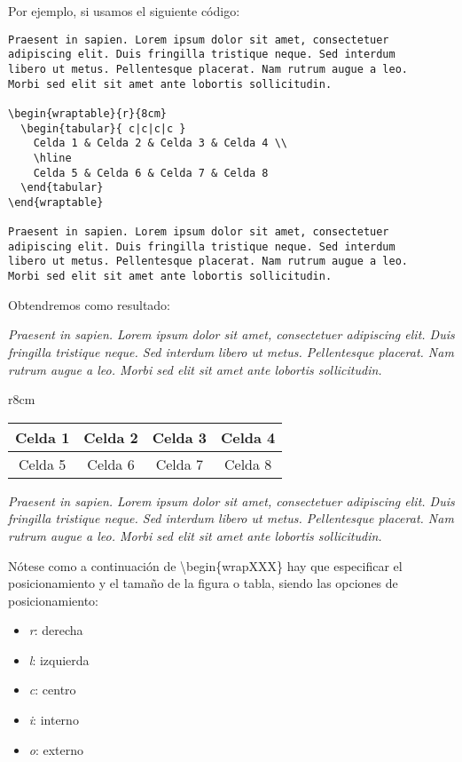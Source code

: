 Por ejemplo, si usamos el siguiente código:

\begin{lstlisting}[language={[LaTeX]TeX}]
Praesent in sapien. Lorem ipsum dolor sit amet, consectetuer 
adipiscing elit. Duis fringilla tristique neque. Sed interdum 
libero ut metus. Pellentesque placerat. Nam rutrum augue a leo. 
Morbi sed elit sit amet ante lobortis sollicitudin.

\begin{wraptable}{r}{8cm}
  \begin{tabular}{ c|c|c|c }
    Celda 1 & Celda 2 & Celda 3 & Celda 4 \\
    \hline
    Celda 5 & Celda 6 & Celda 7 & Celda 8
  \end{tabular}
\end{wraptable}

Praesent in sapien. Lorem ipsum dolor sit amet, consectetuer 
adipiscing elit. Duis fringilla tristique neque. Sed interdum 
libero ut metus. Pellentesque placerat. Nam rutrum augue a leo. 
Morbi sed elit sit amet ante lobortis sollicitudin.
\end{lstlisting}


Obtendremos como resultado:

\emph{Praesent in sapien. Lorem ipsum dolor sit amet, consectetuer 
adipiscing elit. Duis fringilla tristique neque. Sed interdum 
libero ut metus. Pellentesque placerat. Nam rutrum augue a leo. 
Morbi sed elit sit amet ante lobortis sollicitudin.}

\begin{wraptable}{r}{8cm}
\begin{tabular}{ c|c|c|c }
 		Celda 1 & Celda 2 & Celda 3 & Celda 4 \\
 		\hline
 		Celda 5 & Celda 6 & Celda 7 & Celda 8
\end{tabular}
\end{wraptable}

\emph{Praesent in sapien. Lorem ipsum dolor sit amet, consectetuer 
adipiscing elit. Duis fringilla tristique neque. Sed interdum 
libero ut metus. Pellentesque placerat. Nam rutrum augue a leo. 
Morbi sed elit sit amet ante lobortis sollicitudin.}

Nótese como a continuación de \textbackslash begin\{wrapXXX\} hay que especificar el posicionamiento y el tamaño de la figura o tabla, siendo las opciones de posicionamiento: 
\begin{itemize}
	\item \emph{r}: derecha
	\item \emph{l}: izquierda
	\item \emph{c}: centro
	\item \emph{i}: interno
	\item \emph{o}: externo
\end{itemize}

